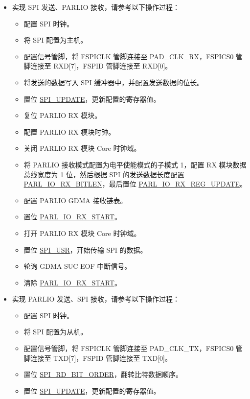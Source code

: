 \documentclass[main\_\_CN.tex]{subfiles}
\begin{document}
\begin{itemize}
    \item 实现 SPI 发送、PARLIO 接收，请参考以下操作过程：
    \begin{itemize}
        \item 配置 SPI 时钟。
        \item 将 SPI 配置为主机。
        \item 配置信号管脚，将 FSPICLK 管脚连接至 PAD\_CLK\_RX，FSPICS0 管脚连接至 RXD[7]，FSPID 管脚连接至 RXD[0]。 
        \item 将发送的数据写入 SPI 缓冲器中，并配置发送数据的位长。
        \item 置位 \hyperref[fielddesc:SPIUPDATE]{SPI\_UPDATE}，更新配置的寄存器值。
        \item 复位 PARLIO RX 模块。
        \item 配置 PARLIO RX 模块时钟。
        \item 关闭 PARLIO RX 模块 Core 时钟域。
        \item 将 PARLIO 接收模式配置为电平使能模式的子模式 1，配置 RX 模块数据总线宽度为 1 位，然后根据 SPI 的发送数据长度配置 \hyperref[fielddesc:PARLIORXBITLEN]{PARL\_IO\_RX\_BITLEN}，最后置位 \hyperref[fielddesc:PARLIORXREGUPDATE]{PARL\_IO\_RX\_REG\_UPDATE}。
        \item 配置 PARLIO GDMA 接收链表。
        \item 置位 \hyperref[fielddesc:PARLIORXSTART]{PARL\_IO\_RX\_START}。
        \item 打开 PARLIO RX 模块 Core 时钟域。
        \item 置位 \hyperref[fielddesc:SPIUSR]{SPI\_USR}，开始传输 SPI 的数据。
        \item 轮询 GDMA SUC EOF 中断信号。
        \item 清除 \hyperref[fielddesc:PARLIORXSTART]{PARL\_IO\_RX\_START}。
    \end{itemize} 
    \item 实现 PARLIO 发送、SPI 接收，请参考以下操作过程：
    \begin{itemize}
        \item 配置 SPI 时钟。
        \item 将 SPI 配置为从机。
        \item 配置信号管脚，将 FSPICLK 管脚连接至 PAD\_CLK\_TX，FSPICS0 管脚连接至 TXD[7]，FSPID 管脚连接至 TXD[0]。
        \item 置位 \hyperref[fielddesc:SPIRDBITORDER]{SPI\_RD\_BIT\_ORDER}，翻转比特数据顺序。
        \item 置位 \hyperref[fielddesc:SPIUPDATE]{SPI\_UPDATE}，更新配置的寄存器值。  

\end{itemize}
\end{itemize}
\end{document}
